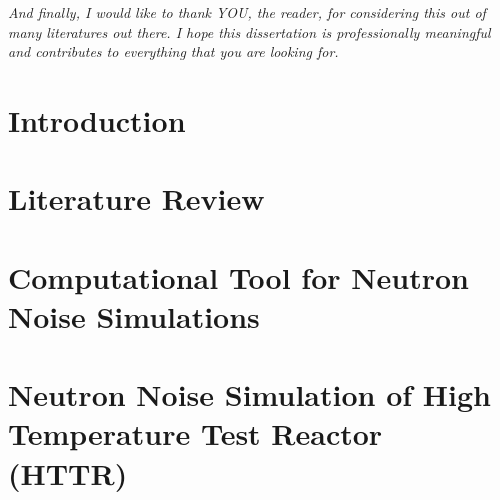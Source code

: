\documentclass{uiucthesis2021}
\begin{document}
\begin{acknowledgments}
\textit{And finally, I would like to thank YOU, the reader, for considering this out of many literatures out there. I hope this dissertation is professionally meaningful and contributes to everything that you are looking for.}

\end{acknowledgments}

{
    \hypersetup{linkcolor=black}  %
    \tableofcontents
}

%
%
%

\mainmatter

\chapter{Introduction}


\chapter{Literature Review}


\chapter{Computational Tool for Neutron Noise Simulations}


\chapter{Neutron Noise Simulation of High Temperature Test Reactor (HTTR)}

\end{document}
